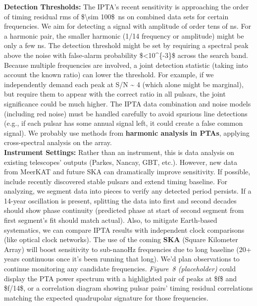 \documentclass[]{article}
\begin{document}
\begin{enumerate}
  \textbf{Detection Thresholds:} The IPTA's recent sensitivity is
  approaching the order of timing residual rms of \$\textbackslash{}sim
  100\$~ns on combined data sets for certain frequencies. We aim for
  detecting a signal with amplitude of order tens of ns. For a harmonic
  pair, the smaller harmonic (1/14 frequency or amplitude) might be only
  a few ns. The detection threshold might be set by requiring a spectral
  peak above the noise with false-alarm probability
  \$\textless{}10\^{}\{-3\}\$ across the search band. Because multiple
  frequencies are involved, a joint detection statistic (taking into
  account the known ratio) can lower the threshold. For example, if we
  independently demand each peak at S/N \textasciitilde{} 4 (which alone
  might be marginal), but require them to appear with the correct ratio
  in all pulsars, the joint significance could be much higher. The IPTA
  data combination and noise models (including red noise) must be
  handled carefully to avoid spurious line detections (e.g., if each
  pulsar has some annual signal left, it could create a false common
  signal). We probably use methods from \textbf{harmonic analysis in
  PTAs}​, applying cross-spectral analysis on the array.\\
  \textbf{Instrument Settings:} Rather than an instrument, this is data
  analysis on existing telescopes' outputs (Parkes, Nancay, GBT, etc.).
  However, new data from MeerKAT and future SKA can dramatically improve
  sensitivity. If possible, include recently discovered stable pulsars
  and extend timing baseline. For analyzing, we segment data into pieces
  to verify any detected period persists. If a 14-year oscillation is
  present, splitting the data into first and second decades should show
  phase continuity (predicted phase at start of second segment from
  first segment's fit should match actual). Also, to mitigate
  Earth-based systematics, we can compare IPTA results with independent
  clock comparisons (like optical clock networks). The use of the coming
  \textbf{SKA} (Square Kilometer Array) will boost sensitivity to
  sub-nanoHz frequencies due to long baseline (20+ years continuous once
  it's been running that long). We'd plan observations to continue
  monitoring any candidate frequencies. \emph{Figure~8 (placeholder)}
  could display the PTA power spectrum with a highlighted pair of peaks
  at \$f\$ and \$f/14\$, or a correlation diagram showing pulsar pairs'
  timing residual correlations matching the expected quadrupolar
  signature for those frequencies.\\

\end{enumerate}
\end{document}
